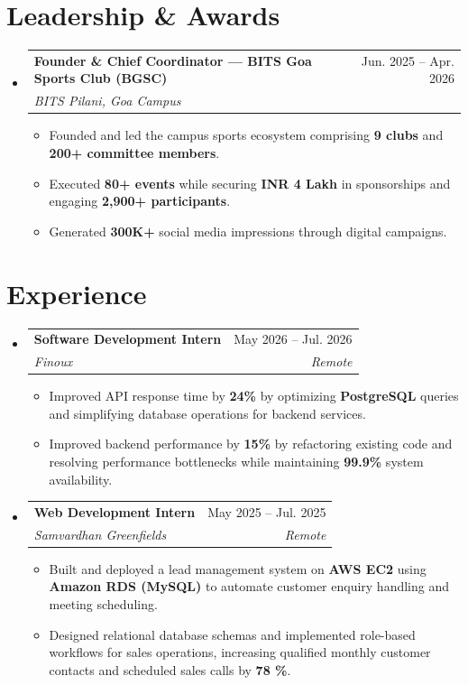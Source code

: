 \documentclass[letterpaper,9pt]{extarticle}
\makeatletter
\newcommand{\resumeItem}[1]{
  \item\small{
    {#1 \vspace{-2pt}}
  }
}
\newcommand{\resumeSubheading}[4]{
  \vspace{-2pt}\item
    \begin{tabular*}{0.98\textwidth}[t]{l@{\extracolsep{\fill}}r}
      \textbf{#1} & #2 \\
      \textit{\small#3} & \textit{\small #4} \\
    \end{tabular*}\vspace{-7pt}
}
\newcommand{\resumeSubHeadingListStart}{\begin{itemize}[leftmargin=0.15in, label={}]}
\newcommand{\resumeSubHeadingListEnd}{\end{itemize}}
\newcommand{\resumeItemListStart}{\begin{itemize}[leftmargin=*, itemsep=1pt, topsep=2pt]}
\newcommand{\resumeItemListEnd}{\end{itemize}\vspace{-5pt}}
\makeatother
\begin{document}
\section{Leadership \& Awards}
\resumeSubHeadingListStart
    \resumeSubheading
      {Founder \& Chief Coordinator --- BITS Goa Sports Club (BGSC)}{Jun. 2025 -- Apr. 2026}
      {BITS Pilani, Goa Campus}{}
      \resumeItemListStart
        \resumeItem{Founded and led the campus sports ecosystem comprising \textbf{9 clubs} and \textbf{200+ committee members}.}
        \resumeItem{Executed \textbf{80+ events} while securing \textbf{INR 4 Lakh} in sponsorships and engaging \textbf{2,900+ participants}.}
        \resumeItem{Generated \textbf{300K+} social media impressions through digital campaigns.}
      \resumeItemListEnd

    
\resumeSubHeadingListEnd

\section{Experience}

\resumeSubHeadingListStart



\resumeSubheading
{Software Development Intern}{May 2026 -- Jul. 2026}
{Finoux}{Remote}
\resumeItemListStart
    \resumeItem{Improved API response time by \textbf{24\%} by optimizing \textbf{PostgreSQL} queries and simplifying database operations for backend services.}
    \resumeItem{Improved backend performance by \textbf{15\%} by refactoring existing code and resolving performance bottlenecks while maintaining \textbf{99.9\%} system availability.}
\resumeItemListEnd






\resumeSubheading
{Web Development Intern}{May 2025 -- Jul. 2025}
{Samvardhan Greenfields}{Remote}
\resumeItemListStart
\resumeItem{Built and deployed a lead management system on \textbf{AWS EC2} using \textbf{Amazon RDS (MySQL)} to automate customer enquiry handling and meeting scheduling.}
\resumeItem{Designed relational database schemas and implemented role-based workflows for sales operations, increasing qualified monthly customer contacts and scheduled sales calls by \textbf{78 \%}.}


\resumeItemListEnd





\resumeSubHeadingListEnd
\end{document}
